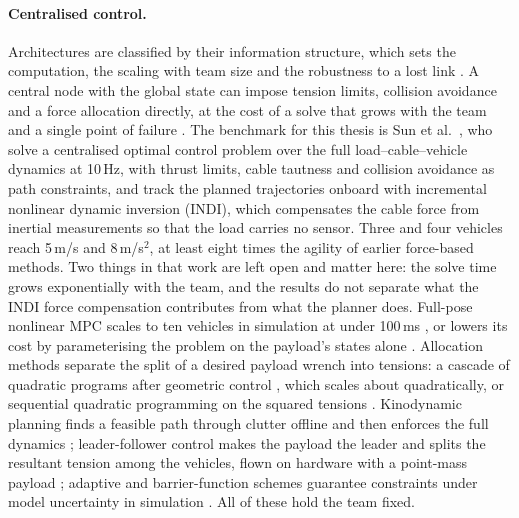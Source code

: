 \paragraph{Centralised control.} Architectures are classified by their information structure, which sets the
computation, the scaling with team size and the robustness to a lost link \cite{nathanReviewAutonomousMultiagent2011}.
A central node with the global state can impose tension limits, collision avoidance and a force allocation
directly, at the cost of a solve that grows with the team and a single point of failure
\cite{dimakosStudyCentralisedDecentralised2021}. The benchmark for this thesis is Sun et al.\ \cite{tudelft}, who
solve a centralised optimal control problem over the full load--cable--vehicle dynamics at 10\,Hz, with thrust
limits, cable tautness and collision avoidance as path constraints, and track the planned trajectories onboard
with incremental nonlinear dynamic inversion (INDI), which compensates the cable force from inertial
measurements so that the load carries no sensor. Three and four vehicles reach 5\,m/s and 8\,m/s$^2$, at least
eight times the agility of earlier force-based methods. Two things in that work are left open and matter here:
the solve time grows exponentially with the team, and the results do not separate what the INDI force
compensation contributes from what the planner does. Full-pose nonlinear MPC scales to ten vehicles in
simulation at under 100\,ms \cite{sunNonlinearMPCFullPose2023}, or lowers its cost by parameterising the problem
on the payload's states alone \cite{liNonlinearModelPredictive2023}. Allocation methods separate the split of a
desired payload wrench into tensions: a cascade of quadratic programs after geometric control
\cite{efficient}, which scales about quadratically, or sequential quadratic programming on the squared tensions
\cite{vazquez-soquiSQPBasedCableTensionAllocation2026}. Kinodynamic planning finds a feasible path through
clutter offline and then enforces the full dynamics \cite{wahbaKinodynamicMotionPlanning2024}; leader-follower
control makes the payload the leader and splits the resultant tension among the vehicles, flown on hardware with
a point-mass payload \cite{tensionbased}; adaptive and barrier-function schemes guarantee constraints under
model uncertainty in simulation \cite{9945662}. All of these hold the team fixed.

